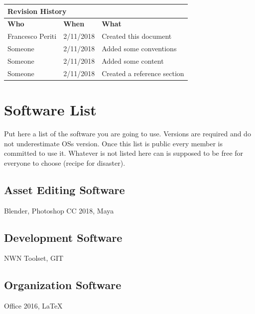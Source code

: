 \documentclass[12pt]{article}
\begin{document}
\begin{center}
\begin{table}[]
\begin{tabular}{lll}
\hline
\multicolumn{3}{|l|}{\cellcolor{gray}\textbf{Revision History}}\\ \hline
\multicolumn{1}{|l|}{\cellcolor{gray}\textbf{Who}} & \multicolumn{1}{l|}{\cellcolor{gray}\textbf{When}} & \multicolumn{1}{l|}{\cellcolor{gray}\textbf{What}}\\ \hline
\multicolumn{1}{|l|}{Francesco Periti} & \multicolumn{1}{l|}{2/11/2018} & \multicolumn{1}{l|}{Created this document}\\ \hline
\multicolumn{1}{|l|}{Someone} & \multicolumn{1}{l|}{2/11/2018} & \multicolumn{1}{l|}{Added some conventions}\\ \hline
\multicolumn{1}{|l|}{Someone} & \multicolumn{1}{l|}{2/11/2018} & \multicolumn{1}{l|}{Added some content}\\ \hline
\multicolumn{1}{|l|}{Someone} & \multicolumn{1}{l|}{2/11/2018} & \multicolumn{1}{l|}{Created a reference section}\\ \hline
\end{tabular}
\end{table}

\end{center}

\section{Software List}
Put here a list of the software you are going to use. Versions are required and do not underestimate OSs version.
Once this list is public every member is committed to use it.
Whatever is not listed here can is supposed to be free for everyone to choose (recipe for disaster).

\subsection{Asset Editing Software}
Blender, Photoshop CC 2018, Maya

\subsection{Development Software}
NWN Toolset, GIT

\subsection{Organization Software}
Office 2016, LaTeX
\end{document}
